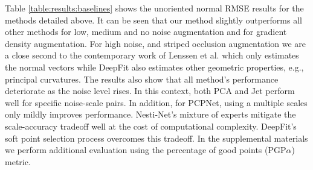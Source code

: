 Table \ref{table:results:baselines} shows the unoriented normal RMSE results for the methods detailed above. It can be seen that our method slightly outperforms all other methods for low, medium and no noise augmentation and for gradient density augmentation. For high noise, and striped occlusion augmentation we are a close second to the contemporary work  of Lenssen et al. \cite{lenssen2019differentiable} which only estimates the normal vectors while DeepFit also estimates other geometric properties, e.g., principal curvatures. 
The results also show that all method's performance deteriorate as the noise level rises. In this context, both PCA and Jet perform well for specific noise-scale pairs. In addition, for PCPNet, using a multiple scales only mildly improves performance. Nesti-Net's mixture of experts mitigate the scale-accuracy tradeoff well at the cost of computational complexity. DeepFit's soft point selection process overcomes this tradeoff. In the supplemental materials we perform additional evaluation using the percentage of good points (PGP$\alpha$) metric.

